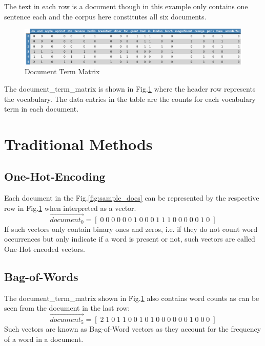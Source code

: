 The text in each row is a \gls{document} though in this example only contains one sentence each and
the \gls{corpus} here constitutes all six \glspl{document}.


\begin{figure}[H]
    \centering
    \includegraphics[width=1.0\textwidth]{Assets/topic_model_count_vector}
    \caption{Document Term Matrix}
    \label{fig:document_term_matrix}
\end{figure}

The \gls{document_term_matrix} is shown in Fig.\ref{fig:document_term_matrix} where the header row represents the \gls{vocabulary}.
The data entries in the table are the counts for each \gls{vocabulary} term in each \gls{document}.


\section{Traditional Methods}\label{sec:traditional-methods}

\subsection{One-Hot-Encoding}\label{subsec:one-hot-encoding}
Each \gls{document} in the Fig.\ref{fig:sample_docs} can be represented by the respective row in Fig.\ref{fig:document_term_matrix} when interpreted as a vector.
$$\vec{document_0} = [\;0\;0\;0\;0\;0\;0\;1\;0\;0\;0\;1\;1\;1\;0\;0\;0\;0\;0\;1\;0\;]$$
If such vectors only contain binary ones and zeros, i.e. if they do not count word occurrences but only indicate if a word is present or not, such vectors are called One-Hot encoded vectors.


\subsection{Bag-of-Words}\label{subsec:bag-of-words}
The \gls{document_term_matrix} shown in Fig.\ref{fig:document_term_matrix} also contains word counts as can be seen from the \gls{document} in the last row:
$$\vec{document_5} = [\;2\;1\;0\;1\;1\;0\;0\;1\;0\;1\;0\;0\;0\;0\;0\;0\;1\;0\;0\;0\;]$$
Such vectors are known as Bag-of-Word vectors as they account for the frequency of a word in a \gls{document}.


